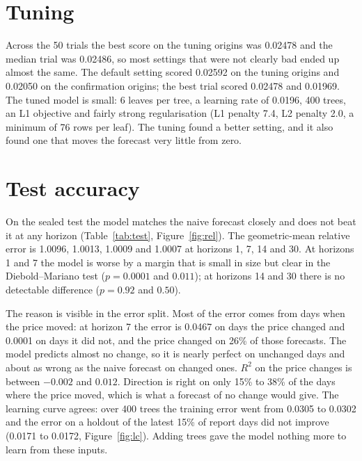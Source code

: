 \documentclass[12pt]{report}
\begin{document}
\section{Tuning}
Across the 50 trials the best score on the tuning origins was 0.02478 and the median trial was 0.02486, so most settings that were not clearly bad ended up almost the same. The default setting scored 0.02592 on the tuning origins and 0.02050 on the confirmation origins; the best trial scored 0.02478 and 0.01969. The tuned model is small: 6 leaves per tree, a learning rate of 0.0196, 400 trees, an L1 objective and fairly strong regularisation (L1 penalty 7.4, L2 penalty 2.0, a minimum of 76 rows per leaf). The tuning found a better setting, and it also found one that moves the forecast very little from zero.

\section{Test accuracy}
On the sealed test the model matches the naive forecast closely and does not beat it at any horizon (Table~\ref{tab:test}, Figure~\ref{fig:rel}). The geometric-mean relative error is 1.0096, 1.0013, 1.0009 and 1.0007 at horizons 1, 7, 14 and 30. At horizons 1 and 7 the model is worse by a margin that is small in size but clear in the Diebold--Mariano test ($p=0.0001$ and $0.011$); at horizons 14 and 30 there is no detectable difference ($p=0.92$ and $0.50$).

The reason is visible in the error split. Most of the error comes from days when the price moved: at horizon 7 the error is 0.0467 on days the price changed and 0.0001 on days it did not, and the price changed on 26\% of those forecasts. The model predicts almost no change, so it is nearly perfect on unchanged days and about as wrong as the naive forecast on changed ones. $R^2$ on the price changes is between $-0.002$ and $0.012$. Direction is right on only 15\% to 38\% of the days where the price moved, which is what a forecast of no change would give. The learning curve agrees: over 400 trees the training error went from 0.0305 to 0.0302 and the error on a holdout of the latest 15\% of report days did not improve (0.0171 to 0.0172, Figure~\ref{fig:lc}). Adding trees gave the model nothing more to learn from these inputs.
\end{document}
